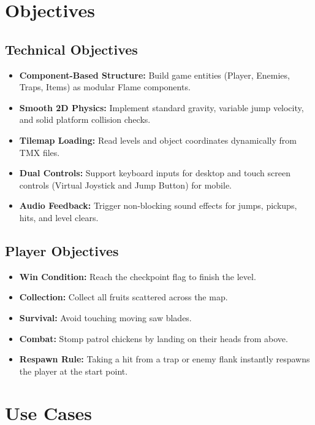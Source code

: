 \documentclass[11pt,a4paper]{article}
\begin{document}
\section{Objectives}

\subsection{Technical Objectives}
\begin{itemize}[noitemsep]
    \item \textbf{Component-Based Structure:} Build game entities (Player, Enemies, Traps, Items) as modular Flame components.
    \item \textbf{Smooth 2D Physics:} Implement standard gravity, variable jump velocity, and solid platform collision checks.
    \item \textbf{Tilemap Loading:} Read levels and object coordinates dynamically from TMX files.
    \item \textbf{Dual Controls:} Support keyboard inputs for desktop and touch screen controls (Virtual Joystick and Jump Button) for mobile.
    \item \textbf{Audio Feedback:} Trigger non-blocking sound effects for jumps, pickups, hits, and level clears.
\end{itemize}

\subsection{Player Objectives}
\begin{itemize}[noitemsep]
    \item \textbf{Win Condition:} Reach the checkpoint flag to finish the level.
    \item \textbf{Collection:} Collect all fruits scattered across the map.
    \item \textbf{Survival:} Avoid touching moving saw blades.
    \item \textbf{Combat:} Stomp patrol chickens by landing on their heads from above.
    \item \textbf{Respawn Rule:} Taking a hit from a trap or enemy flank instantly respawns the player at the start point.
\end{itemize}

\section{Use Cases}
\end{document}
